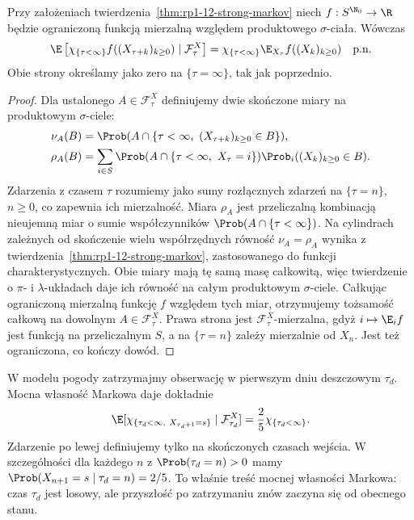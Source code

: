 \begin{wniosek}
\label{cor:rp1-12-strong-markov-path}
Przy założeniach twierdzenia~\ref{thm:rp1-12-strong-markov}
niech $f:S^{\N_0}\to\R$ będzie ograniczoną funkcją
mierzalną względem produktowego $\sigma$-ciała.
Wówczas
\[
\E\left[\chi_{\{\tau<\infty\}}
 f((X_{\tau+k})_{k\geq0})\mid\mathcal F_\tau^X\right]
=\chi_{\{\tau<\infty\}}\E_{X_\tau}f((X_k)_{k\geq0})
\quad\text{p.n.}
\]
Obie strony określamy jako zero na $\{\tau=\infty\}$,
tak jak poprzednio.
\end{wniosek}
\begin{proof}
Dla ustalonego $A\in\mathcal F_\tau^X$ definiujemy
dwie skończone miary na produktowym $\sigma$-ciele:
\begin{align*}
\nu_A(B)&=\Prob(A\cap\{\tau<\infty,\ (X_{\tau+k})_{k\geq0}\in B\}),\\
\rho_A(B)&=\sum_{i\in S}\Prob(A\cap\{\tau<\infty,\ X_\tau=i\})
  \Prob_i((X_k)_{k\geq0}\in B).
\end{align*}
Zdarzenia z czasem $\tau$ rozumiemy jako sumy
rozłącznych zdarzeń na $\{\tau=n\}$, $n\geq0$,
co zapewnia ich mierzalność. Miara $\rho_A$ jest
przeliczalną kombinacją nieujemną miar o sumie
współczynników $\Prob(A\cap\{\tau<\infty\})$.
Na cylindrach zależnych od skończenie wielu
współrzędnych równość $\nu_A=\rho_A$ wynika
z twierdzenia~\ref{thm:rp1-12-strong-markov},
zastosowanego do funkcji charakterystycznych.
Obie miary mają tę samą masę całkowitą, więc
twierdzenie o $\pi$- i $\lambda$-układach daje
ich równość na całym produktowym $\sigma$-ciele.
Całkując ograniczoną mierzalną funkcję $f$
względem tych miar, otrzymujemy tożsamość
całkową na dowolnym $A\in\mathcal F_\tau^X$.
Prawa strona jest $\mathcal F_\tau^X$-mierzalna,
gdyż $i\mapsto\E_i f$ jest funkcją na
przeliczalnym $S$, a na $\{\tau=n\}$ zależy
mierzalnie od $X_n$. Jest też ograniczona,
co kończy dowód.
\end{proof}

\begin{przyklad}
W modelu pogody zatrzymajmy obserwację w pierwszym
dniu deszczowym $\tau_d$. Mocna własność Markowa daje dokładnie
\[
\E[\chi_{\{\tau_d<\infty,\ X_{\tau_d+1}=s\}}
\mid\mathcal F_{\tau_d}^X]
=\frac25\chi_{\{\tau_d<\infty\}}.
\]
Zdarzenie po lewej definiujemy tylko na
skończonych czasach wejścia. W szczególności
dla każdego $n$ z $\Prob(\tau_d=n)>0$ mamy
$\Prob(X_{n+1}=s\mid\tau_d=n)=2/5$.
To właśnie treść mocnej własności Markowa:
czas $\tau_d$ jest losowy, ale przyszłość po
zatrzymaniu znów zaczyna się od obecnego stanu.
\end{przyklad}

